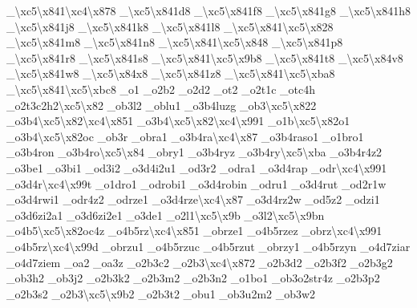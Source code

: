 {\-\_\textbackslash{}xc5\textbackslash{}x841\textbackslash{}xc4\textbackslash{}x878 \-\_\textbackslash{}xc5\textbackslash{}x841d8 \-\_\textbackslash{}xc5\textbackslash{}x841f8 \-\_\textbackslash{}xc5\textbackslash{}x841g8 \-\_\textbackslash{}xc5\textbackslash{}x841h8 \-\_\textbackslash{}xc5\textbackslash{}x841j8 \-\_\textbackslash{}xc5\textbackslash{}x841k8 \-\_\textbackslash{}xc5\textbackslash{}x841l8 \-\_\textbackslash{}xc5\textbackslash{}x841\textbackslash{}xc5\textbackslash{}x828 \-\_\textbackslash{}xc5\textbackslash{}x841m8 \-\_\textbackslash{}xc5\textbackslash{}x841n8 \-\_\textbackslash{}xc5\textbackslash{}x841\textbackslash{}xc5\textbackslash{}x848 \-\_\textbackslash{}xc5\textbackslash{}x841p8 \-\_\textbackslash{}xc5\textbackslash{}x841r8 \-\_\textbackslash{}xc5\textbackslash{}x841s8 \-\_\textbackslash{}xc5\textbackslash{}x841\textbackslash{}xc5\textbackslash{}x9b8 \-\_\textbackslash{}xc5\textbackslash{}x841t8 \-\_\-\textbackslash{}xc5\textbackslash{}x84v8 \-\_\textbackslash{}xc5\textbackslash{}x841w8 \-\_\-\textbackslash{}xc5\textbackslash{}x84x8 \-\_\textbackslash{}xc5\textbackslash{}x841z8 \-\_\textbackslash{}xc5\textbackslash{}x841\textbackslash{}xc5\textbackslash{}xba8 \-\_\textbackslash{}xc5\textbackslash{}x841\textbackslash{}xc5\textbackslash{}xbc8 \-\_\-o1 \-\_\-o2b2 \-\_\-o2d2 \-\_\-ot2 \-\_\-o2t1c \-\_\-otc4h \-\_\-o2t3c2h2\textbackslash{}xc5\textbackslash{}x82 \-\_\-ob3l2 \-\_\-oblu1 \-\_\-o3b4luzg \-\_\-ob3\textbackslash{}xc5\textbackslash{}x822 \-\_\-o3b4\textbackslash{}xc5\textbackslash{}x82\textbackslash{}xc4\textbackslash{}x851 \-\_\-o3b4\textbackslash{}xc5\textbackslash{}x82\textbackslash{}xc4\textbackslash{}x991 \-\_\-o1b\textbackslash{}xc5\textbackslash{}x82o1 \-\_\-o3b4\textbackslash{}xc5\textbackslash{}x82oc \-\_\-ob3r \-\_\-obra1 \-\_\-o3b4ra\textbackslash{}xc4\textbackslash{}x87 \-\_\-o3b4raso1 \-\_\-o1bro1 \-\_\-o3b4ron \-\_\-o3b4ro\textbackslash{}xc5\textbackslash{}x84 \-\_\-obry1 \-\_\-o3b4ryz \-\_\-o3b4ry\textbackslash{}xc5\textbackslash{}xba \-\_\-o3b4r4z2 \-\_\-o3be1 \-\_\-o3bi1 \-\_\-od3i2 \-\_\-o3d4i2u1 \-\_\-od3r2 \-\_\-odra1 \-\_\-o3d4rap \-\_\-odr\textbackslash{}xc4\textbackslash{}x991 \-\_\-o3d4r\textbackslash{}xc4\textbackslash{}x99t \-\_\-o1dro1 \-\_\-odrobi1 \-\_\-o3d4robin \-\_\-odru1 \-\_\-o3d4rut \-\_\-od2r1w \-\_\-o3d4rwi1 \-\_\-odr4z2 \-\_\-odrze1 \-\_\-o3d4rze\textbackslash{}xc4\textbackslash{}x87 \-\_\-o3d4rz2w \-\_\-od5z2 \-\_\-odzi1 \-\_\-o3d6zi2a1 \-\_\-o3d6zi2e1 \-\_\-o3de1 \-\_\-o2l1\textbackslash{}xc5\textbackslash{}x9b \-\_\-o3l2\textbackslash{}xc5\textbackslash{}x9bn \-\_\-o4b5\textbackslash{}xc5\textbackslash{}x82oc4z \-\_\-o4b5rz\textbackslash{}xc4\textbackslash{}x851 \-\_\-obrze1 \-\_\-o4b5rzez \-\_\-obrz\textbackslash{}xc4\textbackslash{}x991 \-\_\-o4b5rz\textbackslash{}xc4\textbackslash{}x99d \-\_\-obrzu1 \-\_\-o4b5rzuc \-\_\-o4b5rzut \-\_\-obrzy1 \-\_\-o4b5rzyn \-\_\-o4d7ziar \-\_\-o4d7ziem \-\_\-oa2 \-\_\-oa3z \-\_\-o2b3c2 \-\_\-o2b3\textbackslash{}xc4\textbackslash{}x872 \-\_\-o2b3d2 \-\_\-o2b3f2 \-\_\-o2b3g2 \-\_\-ob3h2 \-\_\-ob3j2 \-\_\-o2b3k2 \-\_\-o2b3m2 \-\_\-o2b3n2 \-\_\-o1bo1 \-\_\-ob3o2str4z \-\_\-o2b3p2 \-\_\-o2b3s2 \-\_\-o2b3\textbackslash{}xc5\textbackslash{}x9b2 \-\_\-o2b3t2 \-\_\-obu1 \-\_\-ob3u2m2 \-\_\-ob3w2 }
